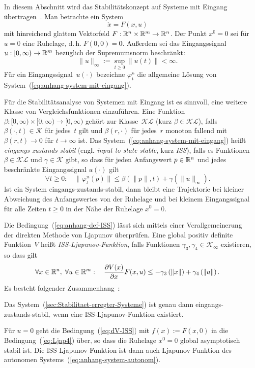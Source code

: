 In diesem Abschnitt wird das Stabilitätskonzept auf Systeme mit Eingang
übertragen~\cite{sontag1995ejc,isidori1999,sontag2000,sontag2008,malisoff2009}.
Man betrachte ein System 
\begin{equation}
\dot{x}=F(x,u)\label{eq:anhang-system-mit-eingang}
\end{equation}
mit hinreichend glattem Vektorfeld $F:{\mathbb{R}}^{n}\times{\mathbb{R}}^{m}\to{\mathbb{R}}^{n}$.
Der Punkt $x^{0}=0$ sei für $u=0$ eine Ruhelage, d.\,h. $F(0,0)=0$.
Außerdem sei das Eingangssignal $u:[0,\infty)\to{\mathbb{R}}^{m}$ bezüglich
der Supremumsnorm beschränkt: 
\[
\|u\|_{\infty}:=\sup_{t\geq0}\|u(t)\|<\infty.
\]
Für ein Eingangssignal~$u(\cdot)$ bezeichne $\varphi_{t}^{u}$ die
allgemeine Lösung von System~(\ref{eq:anhang-system-mit-eingang}). 

Für die Stabilitätsanalyse von Systemen mit Eingang ist es sinnvoll,
eine weitere Klasse von Vergleichsfunktionen
einzuführen. Eine Funktion $\beta:[0,\infty)\times[0,\infty)\to[0,\infty)$
gehört zur Klasse~$\mathcal{KL}$ (kurz $\beta\in\mathcal{KL}$),
falls $\beta(\cdot,t)\in\mathcal{K}$ für jedes~$t$ gilt und $\beta(r,\cdot)$
für jedes~$r$ monoton fallend mit $\beta(r,t)\to0$ für $t\to\infty$
ist. Das System~(\ref{eq:anhang-system-mit-eingang}) heißt \emph{eingangs-zustands-stabil}
(engl. \emph{input-to-state stable}, kurz \emph{ISS}), falls es Funktionen
$\beta\in\mathcal{KL}$ und $\gamma\in\mathcal{K}$ gibt, so dass
für jeden Anfangswert $p\in{\mathbb{R}}^{n}$ und jedes beschränkte Eingangssignal
$u(\cdot)$ gilt 
\begin{equation}
\forall t\geq0:\quad\|\varphi_{t}^{u}(p)\|\leq\beta\left(\|p\|,t\right)+\gamma\left(\|u\|_{\infty}\right).\label{eq:anhang-def-ISS}
\end{equation}
Ist ein System eingangs-zustands-stabil, dann bleibt eine Trajektorie
bei kleiner Abweichung des Anfangswertes von der Ruhelage und bei
kleinem Eingangssignal für alle Zeiten $t\geq0$ in der Nähe der Ruhelage
$x^{0}=0$. 

Die Bedingung~(\ref{eq:anhang-def-ISS}) lässt sich mittels einer
Verallgemeinerung der direkten Methode von Ljapunov überprüfen. Eine
global positiv definite Funktion~$V$ heißt \emph{ISS-Ljapunov-Funktion},
falls Funktionen $\gamma_{3},\gamma_{4}\in\mathcal{K}_{\infty}$ existieren,
so dass gilt
\begin{equation}
\forall x\in{\mathbb{R}}^{n},\;\forall u\in{\mathbb{R}}^{m}:\quad\frac{\partial V(x)}{\partial x}F(x,u)\leq-\gamma_{3}\left(\|x\|\right)+\gamma_{4}\left(\|u\|\right).\label{eq:dV-ISS}
\end{equation}
Es besteht folgender Zusammenhang~\cite{sontag95scl}:
\begin{theorem}
\label{them:ISS-Lyapunov}Das System~(\ref{sec:Stabilitaet-erregter-Systeme})
ist genau dann eingangs-zustands-stabil, wenn eine ISS-Ljapunov-Funktion
existiert.
\end{theorem}
Für $u=0$ geht die Bedingung~(\ref{eq:dV-ISS}) mit $f(x):=F(x,0)$
in die Bedingung~(\ref{eq:Ljap4}) über, so dass die Ruhelage $x^{0}=0$
global asymptotisch stabil ist. Die ISS-Ljapunov-Funktion ist dann
auch Ljapunov-Funktion des autonomen Systems~(\ref{eq:anhang-system-autonom}). 

